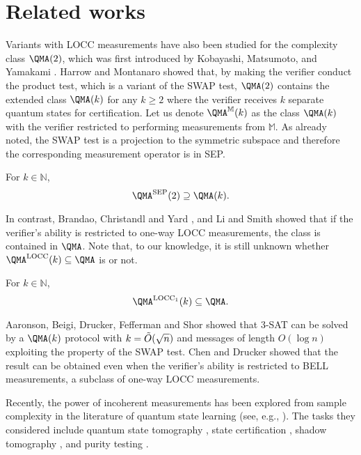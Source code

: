 \section{Related works}
\label{sec:related}

Variants with LOCC measurements have also been studied for the complexity class $\QMA(2)$, which was first introduced by Kobayashi, Matsumoto, and Yamakami \cite{KMY03}. Harrow and Montanaro \cite{HM13} showed that, by making the verifier conduct the product test, which is a variant of the SWAP test, $\QMA(2)$ contains the extended class $\QMA(k)$ for any $k\geq 2$ where the verifier receives $k$ separate quantum states for certification. Let us denote $\QMA^\mathbb{M}(k)$ as the class $\QMA(k)$ with the verifier restricted to performing measurements from $\mathbb{M}$. As already noted, the SWAP test is a projection to the symmetric subspace and therefore the corresponding measurement operator is in SEP.

\begin{theorem}
For $k \in \mathbb{N}$,
\[
    \QMA^\mathrm{SEP}(2) \supseteq \QMA(k).
\]
\end{theorem}

In contrast, Brandao, Christandl and Yard \cite{BCY11}, and Li and Smith \cite{LS15} showed that if the verifier's ability is restricted to one-way LOCC measurements, the class is contained in $\QMA$. Note that, to our knowledge, it is still unknown whether $\QMA^{\mathrm{LOCC}}(k) \subseteq \QMA$ is or not.

\begin{theorem}
For $k \in \mathbb{N}$,
\[
    \QMA^{\mathrm{LOCC}_1}(k) \subseteq \QMA.
\]    
\end{theorem}

Aaronson, Beigi, Drucker, Fefferman and Shor \cite{ABD+09} showed that 3-SAT can be solved by a $\QMA(k)$ protocol with $k=\Tilde{O}(\sqrt{n})$ and messages of length $O(\log n)$ exploiting the property of the SWAP test. Chen and Drucker \cite{CD10} showed that the result can be obtained even when the verifier's ability is restricted to BELL measurements, a subclass of one-way LOCC measurements. 

Recently, the power of incoherent measurements has been explored from sample complexity in the literature of quantum state learning (see, e.g., \cite{BCL20,HKP21,ACQ22,CLO22,CCHL22,CHLL22,CHL+23,CLL24,CGY24}). The tasks they considered include quantum state tomography \cite{HHJ+16,OW16}, state certification \cite{BOW19}, shadow tomography \cite{Aar18,HKP20}, and purity testing \cite{MdW16}.

